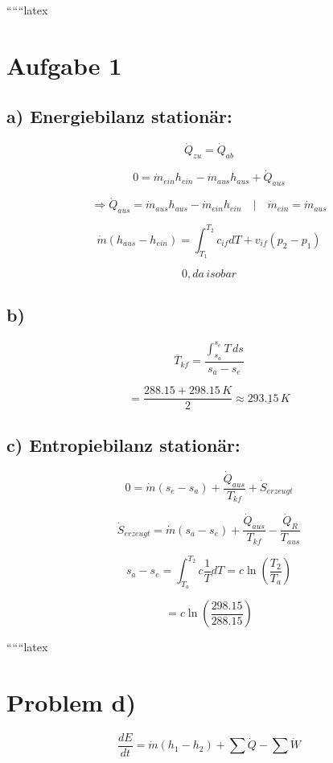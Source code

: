 
``````latex


\section*{Aufgabe 1}

\subsection*{a) Energiebilanz stationär:}

\[
\dot{Q}_{zu} = \dot{Q}_{ab}
\]

\[
0 = \dot{m}_{ein} h_{ein} - \dot{m}_{aus} h_{aus} + \dot{Q}_{aus}
\]

\[
\Rightarrow \dot{Q}_{aus} = \dot{m}_{aus} h_{aus} - \dot{m}_{ein} h_{ein} \quad | \quad \dot{m}_{ein} = \dot{m}_{aus}
\]

\[
\dot{m} (h_{aus} - h_{ein}) = \int_{T_1}^{T_2} c_{if} dT + v_{if} (p_2 - p_1)
\]

\[
0, da \, isobar
\]

\subsection*{b)}

\[
\overline{T}_{kf} = \frac{\int_{s_a}^{s_e} T \, ds}{s_a - s_e}
\]

\[
= \frac{288.15 + 298.15 \, K}{2} \approx \underline{293.15 \, K}
\]

\subsection*{c) Entropiebilanz stationär:}

\[
0 = \dot{m} (s_e - s_a) + \frac{\dot{Q}_{aus}}{T_{kf}} + \dot{S}_{erzeugt}
\]

\[
\dot{S}_{erzeugt} = \dot{m} (s_a - s_e) + \frac{\dot{Q}_{aus}}{T_{kf}} - \frac{\dot{Q}_{R}}{T_{aus}}
\]

\[
s_a - s_e = \int_{T_a}^{T_2} c \frac{1}{T} dT = c \ln \left( \frac{T_2}{T_a} \right)
\]

\[
= c \ln \left( \frac{298.15}{288.15} \right)
\]

``````latex

\section*{Problem d)}

\begin{equation*}
\frac{dE}{dt} = \dot{m}(h_1 - h_2) + \sum \dot{Q} - \sum \dot{W}
\end{equation*}

